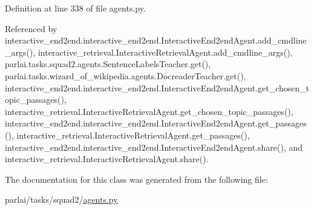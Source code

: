 Definition at line 338 of file agents.\+py.



Referenced by interactive\+\_\+end2end.\+interactive\+\_\+end2end.\+Interactive\+End2end\+Agent.\+add\+\_\+cmdline\+\_\+args(), interactive\+\_\+retrieval.\+Interactive\+Retrieval\+Agent.\+add\+\_\+cmdline\+\_\+args(), parlai.\+tasks.\+squad2.\+agents.\+Sentence\+Labels\+Teacher.\+get(), parlai.\+tasks.\+wizard\+\_\+of\+\_\+wikipedia.\+agents.\+Docreader\+Teacher.\+get(), interactive\+\_\+end2end.\+interactive\+\_\+end2end.\+Interactive\+End2end\+Agent.\+get\+\_\+chosen\+\_\+topic\+\_\+passages(), interactive\+\_\+retrieval.\+Interactive\+Retrieval\+Agent.\+get\+\_\+chosen\+\_\+topic\+\_\+passages(), interactive\+\_\+end2end.\+interactive\+\_\+end2end.\+Interactive\+End2end\+Agent.\+get\+\_\+passages(), interactive\+\_\+retrieval.\+Interactive\+Retrieval\+Agent.\+get\+\_\+passages(), interactive\+\_\+end2end.\+interactive\+\_\+end2end.\+Interactive\+End2end\+Agent.\+share(), and interactive\+\_\+retrieval.\+Interactive\+Retrieval\+Agent.\+share().



The documentation for this class was generated from the following file\+:\begin{DoxyCompactItemize}
\item 
parlai/tasks/squad2/\hyperlink{parlai_2tasks_2squad2_2agents_8py}{agents.\+py}\end{DoxyCompactItemize}
